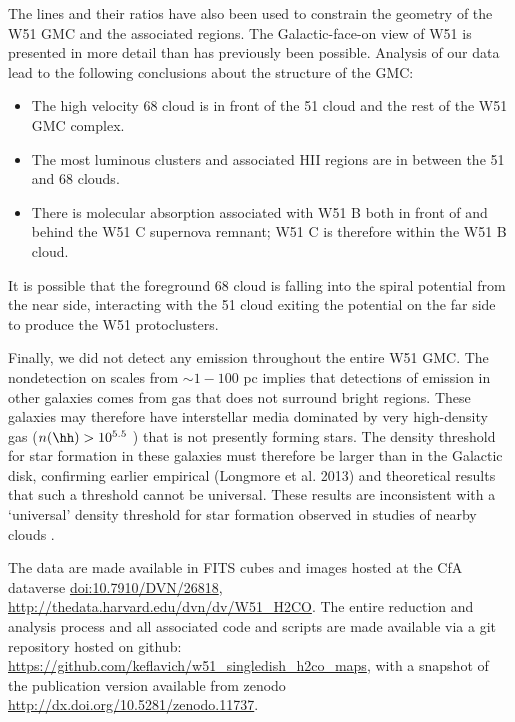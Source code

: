 The \formaldehyde lines and their ratios have also been used to constrain the
geometry of the W51 GMC and the associated \hii regions.  The Galactic-face-on
view of W51 is presented in more detail than has previously been possible.
Analysis of our \formaldehyde data lead to the following conclusions about the
structure of the GMC:
\begin{itemize}
    \item The high velocity 68 \kms cloud is in front of the 51 \kms cloud
        and the rest of the W51 GMC complex.
    \item The most luminous clusters and associated HII regions are in between
        the 51 \kms and 68 \kms clouds.
    \item There is molecular absorption associated with W51 B both in front of
        and behind the W51 C supernova remnant; W51 C is therefore within the
        W51 B cloud.
\end{itemize}
It is possible that the foreground 68 \kms cloud is falling into the spiral
potential from the near side, interacting with the 51 \kms cloud exiting the
potential on the far side to produce the W51 protoclusters.  

Finally, we did not detect any \formaldehyde emission throughout the entire W51
GMC.  The nondetection on scales from $\sim1-100$ pc implies that detections of
\formaldehyde \oneone emission in other galaxies comes from gas that does not
surround bright \hii regions.  These galaxies may therefore have interstellar
media dominated by very high-density gas ($n(\hh)>10^{5.5}$ \percc) that is not
presently forming stars.
The density threshold for star formation in these galaxies must
therefore be larger than in the Galactic disk, confirming earlier empirical
(Longmore et al.  2013) and theoretical
\citep{Krumholz2005a,Hennebelle2013a,Padoan2011b} results
that such a threshold cannot
be universal. These results are inconsistent with a `universal' density
threshold for star formation observed in studies of nearby clouds
\citep{Lada2010a,Lada2012a,Andre2013c}.

The data are made available in FITS cubes and images hosted at the CfA
dataverse \url{doi:10.7910/DVN/26818},
\url{http://thedata.harvard.edu/dvn/dv/W51_H2CO}.
The entire reduction and analysis process and all associated code and scripts
are made available via a git
repository hosted on github:
\url{https://github.com/keflavich/w51_singledish_h2co_maps}, with a
snapshot of the publication version available from zenodo
\url{http://dx.doi.org/10.5281/zenodo.11737}.


